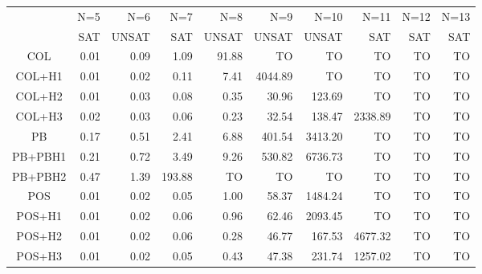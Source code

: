 
\begin{tabular}[c]{|c|r|r|r|r|r|r|r|r|r|}\hline
               & N=5  & N=6     & N=7          & N=8          &    N=9                &   N=10                   &    N=11& N=12& N=13 \\
               & SAT  & UNSAT   & SAT          & UNSAT        &  UNSAT        &  UNSAT         &    SAT & SAT & SAT \\\hline
    COL        & 0.01 & 0.09    & 1.09         & 91.88        & TO            &      TO        &      TO&   TO& TO \\
    COL+H1     & 0.01 & 0.02    & 0.11         & 7.41         & 4044.89       &      TO        &      TO&   TO& TO \\
    COL+H2     & 0.01 & 0.03    & 0.08         & 0.35         & \alert{30.96} &  \alert{123.69}&      TO&   TO& TO \\
    COL+H3     & 0.02 & 0.03    & 0.06         & \alert{0.23} & 32.54         &  138.47        & 2338.89&   TO& TO \\
    PB         & 0.17 & 0.51    & 2.41         & 6.88         & 401.54        & 3413.20        &      TO&   TO& TO \\
    PB+PBH1    & 0.21 & 0.72    & 3.49         & 9.26         & 530.82        & 6736.73        &      TO&   TO& TO \\
    PB+PBH2    & 0.47 & 1.39    & 193.88       & TO           & TO            & TO             &      TO&   TO& TO \\
    POS        & 0.01 & 0.02    & \alert{0.05} & 1.00         & 58.37 & 1484.24&              TO&   TO& TO \\
    POS+H1     & 0.01 & 0.02    & 0.06                  & 0.96         & 62.46 & 2093.45&              TO&   TO& TO \\
    POS+H2     & 0.01 & 0.02    & 0.06         & 0.28         & 46.77 &  167.53&         4677.32&   TO& TO \\
    POS+H3     & 0.01 & 0.02    & \alert{0.05} & 0.43         & 47.38 &  231.74& \alert{1257.02}&   TO& TO \\\hline 
\end{tabular}
